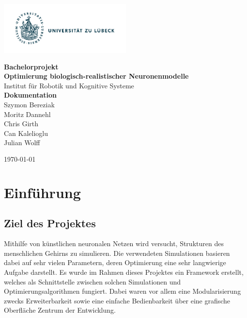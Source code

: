 \documentclass[
  a4paper,               %
  twoside,               %
  DIV=12,                %
  BCOR=8mm,              %
  headinclude=true,      %
  footinclude=false,     %
  numbers=noenddot,      %
  headheight=40pt,       %
  11pt]{scrartcl}        %
\begin{document}
\begin{titlepage}

\flushleft\includegraphics[width=0.5\textwidth]{./Logo_Uni_Luebeck_CMYK} \\[1cm]
\color{unifarbe}
\begin{center}
\textbf{\Huge Bachelorprojekt} \\[0.5cm]
\textbf{\Huge Optimierung biologisch-realistischer Neuronenmodelle}\\[0.5cm]

Institut für Robotik und Kognitive Systeme\\[2.5cm]
\textbf{\Large Dokumentation}\\[1.5cm]

Szymon Bereziak\\
Moritz Dannehl\\
Chris Girth\\
Can Kalelioglu\\
Julian Wolff\\
\end{center}

\vfill
\today

\end{titlepage}
\tableofcontents\newpage
\section{Einführung}
\subsection{Ziel des Projektes}

Mithilfe von künstlichen neuronalen Netzen wird versucht, Strukturen des menschlichen Gehirns zu simulieren. Die verwendeten Simulationen basieren dabei auf sehr vielen Parametern, deren Optimierung eine sehr langwierige Aufgabe darstellt. Es wurde im Rahmen dieses Projektes ein Framework erstellt, welches als Schnittstelle zwischen solchen Simulationen und Optimierungsalgorithmen fungiert. Dabei waren vor allem eine Modularisierung zwecks Erweiterbarkeit sowie eine einfache Bedienbarkeit über eine grafische Oberfläche Zentrum der Entwicklung.
\end{document}
